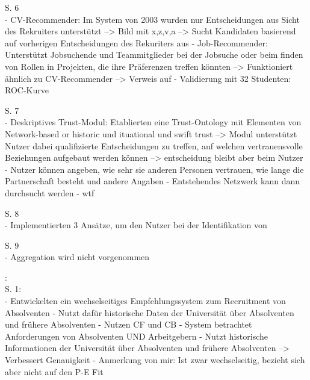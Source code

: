 S. 6\\
- CV-Recommender: Im System von 2003 wurden nur Entscheidungen aus Sicht des Rekruiters unterstützt --> Bild mit x,z,v,a --> Sucht Kandidaten basierend auf vorherigen Entscheidungen des Rekuriters aus
- Job-Recommender: Unterstützt Jobsuchende und Teammitglieder bei der Jobsuche oder beim finden von Rollen in Projekten, die ihre Präferenzen treffen könnten --> Funktioniert ähnlich zu CV-Recommender --> Verweis auf \textcite{malinowski:2006}
- Validierung mit 32 Studenten: ROC-Kurve

S. 7\\
- Deskriptives Trust-Modul: Etablierten eine Trust-Ontology mit Elementen von Network-based or historic und ituational und swift trust --> Modul unterstützt Nutzer dabei qualifizierte Entscheidungen zu treffen, auf welchen vertrauensvolle Beziehungen aufgebaut werden können --> entscheidung bleibt aber beim Nutzer
- Nutzer können angeben, wie sehr sie anderen Personen vertrauen, wie lange die Partnerschaft besteht und andere Angaben
- Entstehendes Netzwerk kann dann durchsucht werden
- wtf

S. 8\\
- Implementierten 3 Ansätze, um den Nutzer bei der Identifikation von 

S. 9\\
- Aggregation wird nicht vorgenommen

\textcite{ding:2016}:\\
S. 1:\\
- Entwickelten ein wechselseitiges Empfehlungssystem zum Recruitment von Absolventen
- Nutzt dafür historische Daten der Universität über Absolventen und frühere Absolventen
- Nutzen CF und CB
- System betrachtet Anforderungen von Absolventen UND Arbeitgebern
- Nutzt historische Informationen der Universität über Absolventen und frühere Absolventen --> Verbessert Genauigkeit
- Anmerkung von mir: Ist zwar wechselseitig, bezieht sich aber nicht auf den P-E Fit

